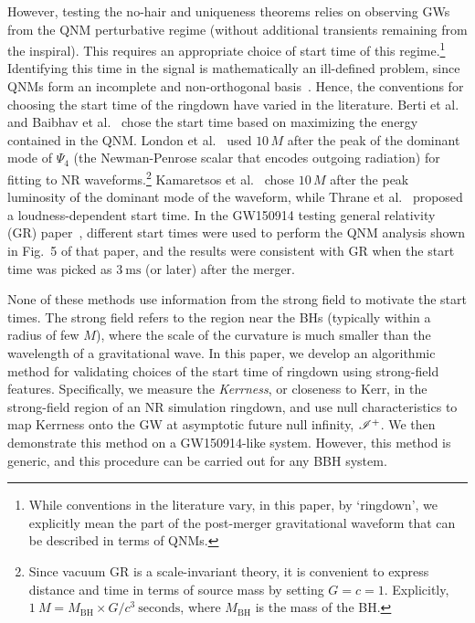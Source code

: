 However, testing the no-hair and uniqueness theorems relies on observing GWs from the QNM perturbative regime (without additional transients remaining from the inspiral). This requires an appropriate choice of start time of this regime.\footnote{While conventions in the literature vary, in this paper, by `ringdown', we explicitly mean the part of the post-merger gravitational waveform that can be described in terms of QNMs.} Identifying this time in the signal is mathematically an ill-defined problem, since QNMs form an incomplete and non-orthogonal basis~\cite{QNMincomplete,QNMnonorthogonal}. Hence, the conventions for choosing the start time of the ringdown have varied in the literature. Berti et al.~\cite{EMOP} and Baibhav et al.~\cite{Baibhav:2017jhs} chose the start time based on maximizing the energy contained in the QNM. London et al.~\cite{London} used $10\,M$ after the peak of the dominant mode of $\Psi_4$ (the Newman-Penrose scalar that encodes outgoing radiation) for fitting to NR waveforms.\footnote{ \label{note1} Since vacuum GR is a scale-invariant theory, it is convenient to express distance and time in terms of source mass by setting $G=c=1$. Explicitly, $ 1~M = M_{\mathrm{BH}} \times G/c^{3} ~\mathrm{seconds}$, where $M_{\mathrm{BH}}$ is the mass of the BH.} Kamaretsos et al.~\cite{2012PhRvL.109n1102K} chose $10\,M$ after the peak luminosity of the dominant mode of the waveform, while Thrane et al.~\cite{Thrane} proposed a loudness-dependent start time. In the  GW150914 testing general relativity (GR) paper~\cite{TheLIGOScientific:2016src}, different start times were used to perform the QNM analysis shown in Fig.~5 of that paper, and the results were consistent with GR when the start time was picked as $3~\mathrm{ms}$ (or later) after the merger.


None of these methods use information from the strong field to motivate the start times. The strong field refers to the region near the BHs (typically within a radius of few $M$), where the scale of the curvature is much smaller than the wavelength of a gravitational wave. In this paper, we develop an algorithmic method for validating choices of the start time of ringdown using strong-field features. Specifically, we measure the \textit{Kerrness}, or closeness to Kerr, in the strong-field region of an NR simulation ringdown, and use null characteristics to map Kerrness onto the GW at asymptotic future null infinity, $\mathscr{I^+}$. We then demonstrate this method on a GW150914-like system. However, this method is generic, and this procedure can be carried out for any BBH system.

